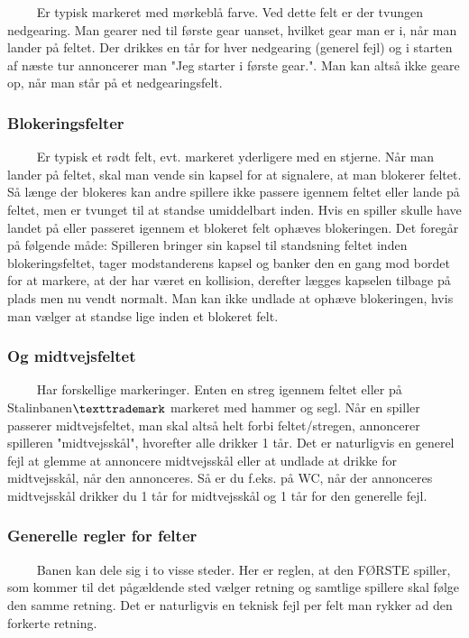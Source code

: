 \documentclass[12pt]{article}
\begin{document}
$\qquad$ Er typisk markeret med mørkeblå farve. Ved dette felt er der tvungen nedgearing. Man gearer ned til første gear uanset, hvilket gear man er i, når man lander på feltet. Der drikkes en tår for hver nedgearing (generel fejl) og i starten af næste tur annoncerer man "Jeg starter i første gear.". Man kan altså ikke geare op, når man står på et nedgearingsfelt.


\subsubsection*{Blokeringsfelter}

$\qquad$ Er typisk et rødt felt, evt. markeret yderligere med en stjerne. Når man lander på feltet, skal man vende sin kapsel for at signalere, at man blokerer feltet. Så længe der blokeres kan andre spillere ikke passere igennem feltet eller lande på feltet, men er tvunget til at standse umiddelbart inden. Hvis en spiller skulle have landet på eller passeret igennem et blokeret felt ophæves blokeringen. Det foregår på følgende måde: Spilleren bringer sin kapsel til standsning feltet inden blokeringsfeltet, tager modstanderens kapsel og banker den en gang mod bordet for at markere, at der har været en kollision, derefter lægges kapselen tilbage på plads men nu vendt normalt. Man kan ikke undlade at ophæve blokeringen, hvis man vælger at standse lige inden et blokeret felt.


\subsubsection*{Og midtvejsfeltet}
$\qquad$ Har forskellige markeringer. Enten en streg igennem feltet eller på Stalinbanen$\texttrademark$ markeret med hammer og segl.
Når en spiller passerer midtvejsfeltet, man skal altså helt forbi feltet/stregen, annoncerer spilleren "midtvejsskål", hvorefter alle drikker 1 tår. Det er naturligvis en generel fejl at glemme at annoncere midtvejsskål eller at undlade at drikke for midtvejsskål, når den annonceres. Så er du f.eks. på WC, når der annonceres midtvejsskål drikker du 1 tår for midtvejsskål og 1 tår for den generelle fejl.


\subsubsection*{Generelle regler for felter}

$\qquad$ Banen kan dele sig i to visse steder. Her er reglen, at den FØRSTE spiller, som kommer til det pågældende sted vælger retning og samtlige spillere skal følge den samme retning. Det er naturligvis en teknisk fejl per felt man rykker ad den forkerte retning.\\
\end{document}
